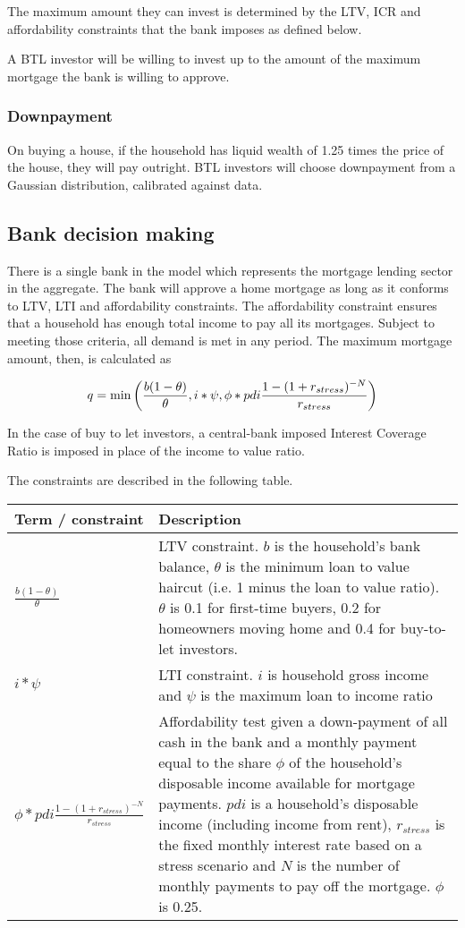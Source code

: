 \documentclass{article}
\begin{document}
The maximum amount they can invest is determined by the LTV, ICR and
affordability constraints that the bank imposes as defined below.

A BTL investor will be willing to invest up to the amount of the maximum mortgage the bank is willing to approve.

\subsubsection{Downpayment}
On buying a house, if the household has liquid wealth of 1.25 times the price of the house, they will pay outright. BTL investors will choose downpayment from a Gaussian distribution, calibrated against data.

\subsection{Bank decision making}

There is a single bank in the model which represents the mortgage lending
sector in the aggregate. The bank will approve a home mortgage as long as it
conforms to LTV, LTI and affordability constraints. The affordability
constraint ensures that a household has enough total income to pay all its
mortgages. Subject to meeting those criteria, all demand is met in any
period. The maximum mortgage amount, then, is calculated as

\bigskip 
\begin{equation}
q=\min \left( \frac{b(1-\theta )}{\theta },i\ast \psi ,\phi \ast pdi\frac{%
1-(1+r_{stress})^{-N}}{r_{stress}}\right)
\end{equation}

\bigskip

In the case of buy to let investors, a central-bank imposed Interest Coverage Ratio is imposed in place of the income to value ratio.

\bigskip The constraints are described in the following table.

\bigskip

\noindent \bigskip 
\begin{tabular}{p{1.5in}|p{4in}}
Term / constraint & Description \\ \hline\hline
$\frac{b(1-\theta )}{\theta }$ & LTV constraint. $b$ is the household's bank
balance, $\theta $ is the minimum loan to value haircut (i.e. 1 minus the
loan to value ratio). $\theta $ is 0.1 for first-time buyers, 0.2 for
homeowners moving home and 0.4 for buy-to-let investors. \\ 
$i\ast \psi $ & LTI constraint. $i$ is household gross income and $\psi $ is
the maximum loan to income ratio \\ 
$\phi \ast pdi\frac{1-(1+r_{stress})^{-N}}{r_{stress}}$ & Affordability test
given a down-payment of all cash in the bank and a monthly payment equal to
the share $\phi $ of the household's disposable income available for
mortgage payments. $pdi$ is a household's disposable income (including
income from rent), $r_{stress}$ is the fixed monthly interest rate based on
a stress scenario and $N$ is the number of monthly payments to pay off the
mortgage. $\phi $ is 0.25.%
\end{tabular}
\end{document}

